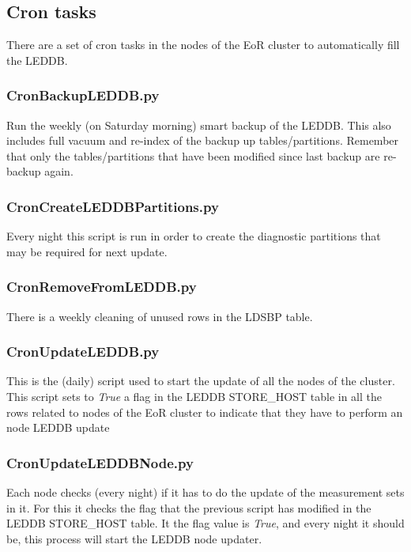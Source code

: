 \documentclass[a4paper,11pt]{article}
\begin{document}
\subsection{Cron tasks}
\label{sec:leddbcron}

There are a set of cron tasks in the nodes of the EoR cluster to automatically fill the LEDDB.

\subsubsection*{CronBackupLEDDB.py}

Run the weekly (on Saturday morning) smart backup of the LEDDB. This also includes full vacuum and re-index of the backup up tables/partitions. Remember that only the tables/partitions that have been modified since last backup are re-backup again.  

\subsubsection*{CronCreateLEDDBPartitions.py}

Every night this script is run in order to create the diagnostic partitions that may be required for next update.

\subsubsection*{CronRemoveFromLEDDB.py}

There is a weekly cleaning of unused rows in the LDSBP table. 

\subsubsection*{CronUpdateLEDDB.py}

This is the (daily) script used to start the update of all the nodes of the cluster. This script sets to \textit{True} a flag in the LEDDB STORE\_HOST table in all the rows related to nodes of the EoR cluster to indicate that they have to perform an node LEDDB update

\subsubsection*{CronUpdateLEDDBNode.py}

Each node checks (every night) if it has to do the update of the measurement sets in it. For this it checks the flag that the previous script has modified in the LEDDB STORE\_HOST table. It the flag value is \textit{True}, and every night it should be, this process will start the LEDDB node updater.
\end{document}
